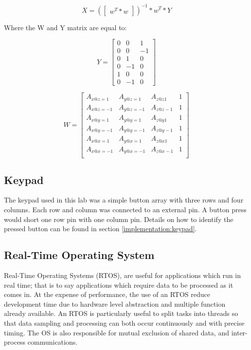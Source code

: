 \documentclass[12pt]{article}
\begin{document}
\begin{equation} \label{cal_eq:2}
 X = (\begin{bmatrix} w^{T}*w \end{bmatrix})^{-1}*w^{T} * Y
 \end{equation}

Where the W and Y matrix are equal to:

\begin{equation} \label{cal_eq:3}
 Y = \begin{bmatrix} 0 & 0 & 1  \\
            0 & 0 & -1 \\
                      0 & 1 & 0  \\
                      0 & -1 & 0 \\
                      1 & 0 & 0  \\
                      0 & -1 & 0
                      \end{bmatrix}
\end{equation}

\begin{equation} \label{cal_eq:4}
 W = \begin{bmatrix} A_{x@z=1} & A_{y@z=1} & A_{z@z1} & 1 \\
            A_{x@z=-1} & A_{y@z=-1} & A_{z@z-1} & 1 \\
                      A_{x@y=1} & A_{y@y=1} & A_{z@y1} & 1 \\
                      A_{x@y=-1} & A_{y@y=-1} & A_{z@y-1} & 1 \\
                      A_{x@x=1} & A_{y@x=1} & A_{z@x1} & 1 \\
                      A_{x@x=-1} & A_{y@x=-1} & A_{z@x-1} & 1 \\
                      \end{bmatrix}
\end{equation}
\subsection{Keypad}
The keypad used in this lab was a simple button array with three rows and four columns. Each row and column was connected to an external pin. A button press would short one row pin with one column pin. Details on how to identify the pressed button can be found in section \ref{implementation:keypad}.


\subsection{Real-Time Operating System}
Real-Time Operating Systems (RTOS), are useful for applications which run in real time; that is to say applications which require data to be processed as it comes in. At the expense of performance, the use of an RTOS reduce development time due to hardware level abstraction and multiple function already available. An RTOS is particularly useful to split tasks into threads so that data sampling and processing can both occur continuously and with precise timing. The OS is also responsible for mutual exclusion of shared data, and inter-process communications.
\end{document}
